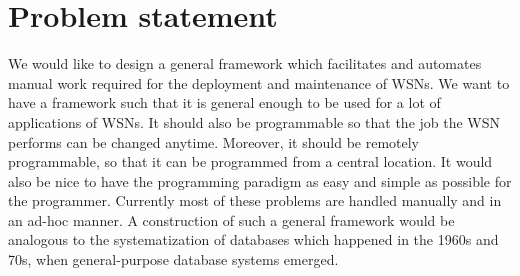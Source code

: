 \documentclass[twocolumn]{article}
\begin{document}
\section{Problem statement}
We would like to design a general framework which facilitates and automates manual work required for the deployment and maintenance of WSNs. We want to have a framework such that it is general enough to be used for a lot of applications of WSNs. It should also be programmable so that the job the WSN performs can be changed anytime. Moreover, it should be remotely programmable, so that it can be programmed from a central location. It would also be nice to have the programming paradigm as easy and simple as possible for the programmer.
Currently most of these problems are handled manually and in an ad-hoc manner. A construction of such a general framework would be analogous to the systematization of databases which happened in the 1960s and 70s, when general-purpose database systems emerged.
\end{document}

